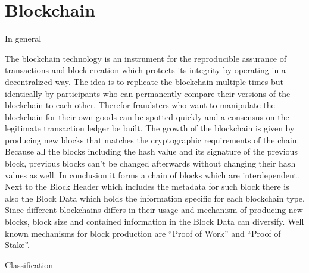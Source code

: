 \section{Blockchain}
In general

The blockchain technology is an instrument for the reproducible assurance of transactions and block creation which protects its integrity by operating in a decentralized way. The idea is to replicate the blockchain multiple times but identically by participants who can permanently compare their versions of the blockchain to each other. Therefor fraudsters who want to manipulate the blockchain for their own goods can be spotted quickly and a consensus on the legitimate transaction ledger be built. 
The growth of the blockchain is given by producing new blocks that matches the cryptographic requirements of the chain. Because all the blocks including the hash value and its signature of the previous block, previous blocks can’t be changed afterwards without changing their hash values as well. In conclusion it forms a chain of blocks which are interdependent. Next to the Block Header which includes the metadata for such block there is also the Block Data which holds the information specific for each blockchain type.
Since different blockchains differs in their usage and mechanism of producing new blocks, block size and contained information in the Block Data can diversify.
Well known mechanisms for block production are “Proof of Work” and “Proof of Stake”.

Classification

